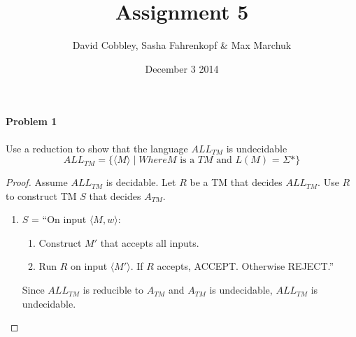 \documentclass{article}
\title{Assignment 5}
\author{David Cobbley, Sasha Fahrenkopf \& Max Marchuk}
\date{December 3 2014}
\begin{document}
\maketitle


\paragraph{Problem 1} Use a reduction to show that the language $ALL_{TM}$ is undecidable
\[ALL_{TM} = \{ \langle M \rangle \;|\; Where M \mbox{ is a $TM$ and $L(M)$ = $\Sigma$*}\} \]


\begin{proof}
    Assume $ALL_{TM}$ is decidable. Let $R$ be a TM that decides $ALL_{TM}$.  Use $R$ to construct TM $S$ that decides $A_{TM}$.
    \begin{enumerate}
        \item $S$ = ``On input $\langle M, w \rangle$:
            \begin{enumerate}[1.]
            \item Construct $M'$ that accepts all inputs.
            \item Run $R$ on input $\langle M' \rangle$. If $R$ accepts, ACCEPT. Otherwise REJECT.''
            \end{enumerate}

        Since $ALL_{TM}$ is reducible to $A_{TM}$ and $A_{TM}$ is undecidable, $ALL_{TM}$ is undecidable.
    \end{enumerate}
    \end{proof}
\end{document}
